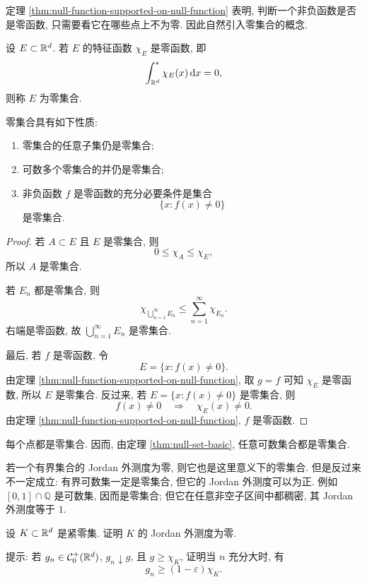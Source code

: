 定理 \ref{thm:null-function-supported-on-null-function} 表明, 判断一个非负函数是否是零函数, 只需要看它在哪些点上不为零. 因此自然引入零集合的概念.

\begin{defn}[零集合]
	\label{def:null-set}
	设 \(E\subset\mathbb{R}^d\). 若 \(E\) 的特征函数 \(\chi_E\) 是零函数, 即
	\[
	\int_{\mathbb{R}^d}^{*}\chi_E(x)\,\dd x=0,
	\]
	则称 \(E\) 为零集合.
\end{defn}

\begin{thm}\label{thm:null-set-basic}
	零集合具有如下性质:
	\begin{enumerate}
		\item 零集合的任意子集仍是零集合;
		\item 可数多个零集合的并仍是零集合;
		\item 非负函数 \(f\) 是零函数的充分必要条件是集合
		\[
		\{x:f(x)\neq0\}
		\]
		是零集合.
	\end{enumerate}
\end{thm}

\begin{proof}
	若 \(A\subset E\) 且 \(E\) 是零集合, 则
	\[
	0\leq \chi_A\leq \chi_E,
	\]
	所以 \(A\) 是零集合.
	
	若 \(E_n\) 都是零集合, 则
	\[
	\chi_{\bigcup_{n=1}^{\infty}E_n}
	\leq
	\sum_{n=1}^{\infty}\chi_{E_n}.
	\]
	右端是零函数, 故 \(\bigcup_{n=1}^{\infty}E_n\) 是零集合.
	
	最后, 若 \(f\) 是零函数, 令
	\[
	E=\{x:f(x)\neq0\}.
	\]
	由定理 \ref{thm:null-function-supported-on-null-function}, 取 \(g=f\) 可知 \(\chi_E\) 是零函数, 所以 \(E\) 是零集合. 反过来, 若 \(E=\{x:f(x)\neq0\}\) 是零集合, 则
	\[
	f(x)\neq0\quad\Longrightarrow\quad \chi_E(x)\neq0.
	\]
	由定理 \ref{thm:null-function-supported-on-null-function}, \(f\) 是零函数.
\end{proof}

\begin{rem}
	每个点都是零集合. 因而, 由定理 \ref{thm:null-set-basic}, 任意可数集合都是零集合.
	
	若一个有界集合的 Jordan 外测度为零, 则它也是这里意义下的零集合. 但是反过来不一定成立: 有界可数集一定是零集合, 但它的 Jordan 外测度可以为正. 例如 \([0,1]\cap\mathbb Q\) 是可数集, 因而是零集合; 但它在任意非空子区间中都稠密, 其 Jordan 外测度等于 \(1\).
\end{rem}

\begin{exer}\label{exer:compact-null-set-jordan-measure-zero}
	设 \(K\subset\mathbb{R}^d\) 是紧零集. 证明 \(K\) 的 Jordan 外测度为零.
	
	提示: 若 \(g_n\in\mathcal{C}_0^+(\mathbb{R}^d)\), \(g_n\downarrow g\), 且 \(g\geq\chi_K\), 证明当 \(n\) 充分大时, 有
	\[
	g_n\geq (1-\varepsilon)\chi_K.
	\]
\end{exer}

